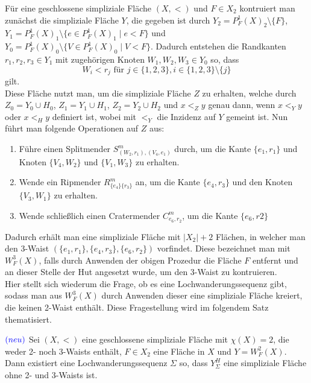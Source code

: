 \documentclass[12pt,titlepage]{article}
\begin{document}
Für eine geschlossene simpliziale Fläche $(X,<)$ und $F \in X_2$ kontruiert man zunächst die simpliziale Fläche $Y$, die gegeben ist durch $Y_2=P^1_F(X)_2\setminus \{F\}$, $Y_1=P^1_F(X)_1\setminus \{e \in P^1_F(X)_1 \mid e<F\}$ und $Y_0=P^1_F(X)_0\setminus \{V \in P^1_F(X)_0 \mid V<F\}$. Dadurch entstehen die Randkanten $r_1,r_2,r_3 \in Y_1$ mit zugehörigen Knoten $W_1,W_2,W_3\in Y_0$ so, dass 
\[
W_i < r_j \text{ für } j\in \{1,2,3\},i\in\{1,2,3\}\setminus \{j\}
\] gilt.\\
Diese Fläche nutzt man, um die simpliziale Fläche $Z$ zu erhalten, welche durch $Z_0=Y_0 \cup H_0$, $Z_1=Y_1 \cup H_1$, $Z_2=Y_2 \cup H_2$ und $x<_Z y$ genau dann, wenn $x <_Y y$ oder $x <_H y$ definiert ist, wobei mit $<_Y$ die Inzidenz auf $Y$ gemeint ist. Nun führt man folgende Operationen auf $Z$ aus:
\begin{enumerate}
\item Führe einen Splitmender $S^m_{(W_2,r_1),(V_4,e_1)}$ durch, um die Kante $\{e_1,r_1\}$ und Knoten $\{V_4,W_2\}$ und $\{V_1,W_3\}$ zu erhalten.
\item Wende ein Ripmender $R^m_{\{e_4\}\{r_3\}}$ an, um die Kante $\{e_4,r_3\}$ und den Knoten $\{V_3,W_1\}$ zu erhalten. 
\item Wende schließlich einen Cratermender $C^m_{e_6,r_2}$, um die Kante $\{e_6,r2\}$
\end{enumerate}
Dadurch erhält man eine simpliziale Fläche mit $\vert X_2\vert +2$ Flächen, in welcher man den 3-Waist $(\{e_1,r_1\},\{e_4,r_3\},\{e_6,r_2\})$ vorfindet. Diese bezeichnet man mit \emph{$W_F^3(X)$}, falls durch Anwenden der obigen Prozedur die Fläche $F$ entfernt und an dieser Stelle der Hut angesetzt wurde, um den 3-Waist zu kontruieren.\\
Hier stellt sich wiederum die Frage, ob es eine Lochwanderungssequenz gibt, sodass man aus $W_F^3(X)$ durch Anwenden dieser eine simpliziale Fläche kreiert, die keinen 2-Waist enthält. Diese Fragestellung wird im folgendem Satz thematisiert.
\begin{satz} $\textcolor{blue}{(neu)}$
Sei $(X,<)$ eine geschlossene simpliziale Fläche mit $\chi(X)=2$, die weder 2- noch 3-Waists enthält, $F \in X_2$ eine Fläche in $X$ und $Y=W^2_F(X)$. Dann existiert eine Lochwanderungssequenz $\Sigma$ so, dass $Y_{\Sigma}^H$ eine simpliziale Fläche ohne 2- und 3-Waists ist.
\end{satz}
\end{document}
